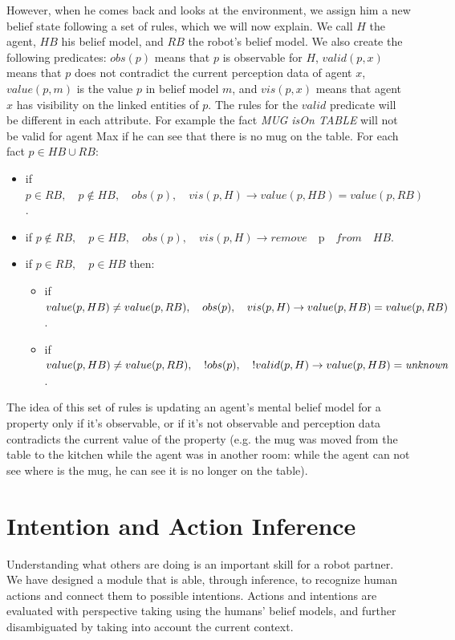 However, when he comes back and looks at the environment, we assign him a new belief state following a set of rules, which we will now explain. We call $H$ the agent, $HB$ his belief model, and $RB$ the robot's belief model. We also create the following predicates: $obs(p)$ means that $p$ is observable for $H$, $valid(p,x)$ means that $p$ does not contradict the current perception data of agent $x$, $value(p,m)$ is the value $p$ in belief model $m$, and $vis(p,x)$ means that agent $x$ has visibility on the linked entities of $p$. The rules for the $valid$ predicate will be different in each attribute. For example the fact \textit{MUG isOn TABLE} will not be valid for agent Max if he can see that there is no mug on the table. For each fact $p\in HB \cup RB$:
\begin{itemize}
\item if $p \in RB, \quad p\not\in HB,\quad obs(p),\quad vis(p,H) \rightarrow value(p,HB)=value(p,RB)$.
\item if $p \not \in RB,\quad p\in HB,\quad obs(p),\quad vis(p,H) \rightarrow remove\quad $p$ \quad from \quad HB$.
\item if $p\in RB,\quad p\in HB$ then:
	\begin{itemize}
      \item if $value(p,HB)\neq value(p,RB),\\ \quad obs(p),\quad vis(p,H) \rightarrow \\ value(p,HB)=value(p,RB)$.
      \item if $value(p,HB)\neq value(p,RB),\\ \quad !obs(p),\quad !valid(p,H) \rightarrow \\ value(p,HB)=\textit{unknown}$.
	\end{itemize}
\end{itemize}
The idea of this set of rules is updating an agent's mental belief model for a property only if it's observable, or if it's not observable and perception data contradicts the current value of the property (e.g. the mug was moved from the table to the kitchen while the agent was in another room: while the agent can not see where is the mug, he can see it is no longer on the table).



\section{Intention and Action Inference}
\label{sec:situation_assessment-intention_recognition}
Understanding what others are doing is an important skill for a robot partner. We have designed a module that is able, through inference, to recognize human actions and connect them to possible intentions. Actions and intentions are evaluated with perspective taking using the humans' belief models, and further disambiguated by taking into account the current context.

